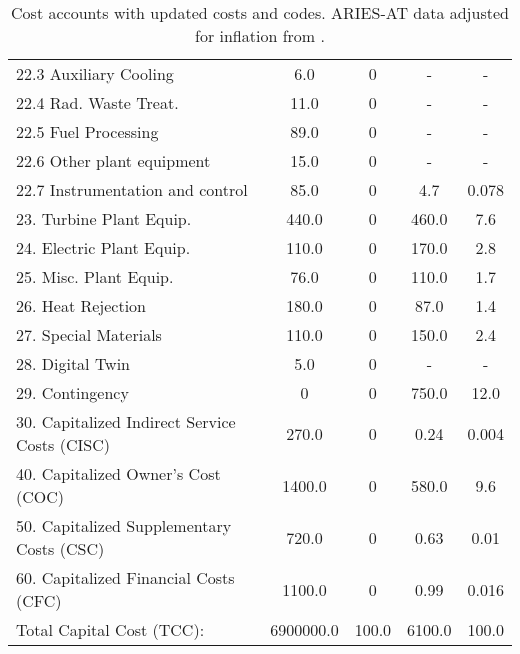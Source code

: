 \begin{table}[h!]
{\begin{tabular}{lcccc}
\hspace{10mm}22.3 Auxiliary Cooling & 6.0 & 0 & - & - \\
\hspace{10mm}22.4 Rad. Waste Treat. & 11.0 & 0 & - & - \\
\hspace{10mm}22.5 Fuel Processing & 89.0 & 0 & - & - \\
\hspace{10mm}22.6 Other plant equipment & 15.0 & 0 & - & - \\
\hspace{10mm}22.7 Instrumentation and control & 85.0 & 0 & 4.7 & 0.078 \\
\hspace{5mm}23. Turbine Plant Equip. & 440.0 & 0 & 460.0 & 7.6 \\
\hspace{5mm}24. Electric Plant Equip. & 110.0 & 0 & 170.0 & 2.8 \\
\hspace{5mm}25. Misc. Plant Equip. & 76.0 & 0 & 110.0 & 1.7 \\
\hspace{5mm}26. Heat Rejection & 180.0 & 0 & 87.0 & 1.4 \\
\hspace{5mm}27. Special Materials & 110.0 & 0 & 150.0 & 2.4 \\
\hspace{5mm}28. Digital Twin & 5.0 & 0 & - & - \\
\hspace{5mm}29. Contingency & 0 & 0 & 750.0 & 12.0 \\
30. Capitalized Indirect Service Costs (CISC) & 270.0 & 0 & 0.24 & 0.004 \\
40. Capitalized Owner’s Cost (COC) & 1400.0 & 0 & 580.0 & 9.6 \\
50. Capitalized Supplementary Costs (CSC) & 720.0 & 0 & 0.63 & 0.01 \\
60. Capitalized Financial Costs (CFC) & 1100.0 & 0 & 0.99 & 0.016 \\
\hline
Total Capital Cost (TCC): & 6900000.0 & 100.0 & 6100.0 & 100.0 \\
\hline
\end{tabular}
}
\caption{Cost accounts with updated costs and codes. ARIES-AT data adjusted for inflation from \cite{gordon1986mirror}.}
\label{tab:costs_updated_codes}
\end{table}


